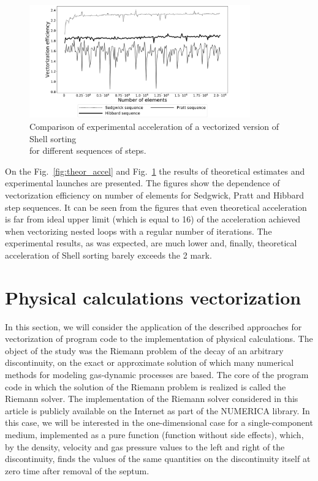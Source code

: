 \documentclass[
11pt,%
tightenlines,%
twoside,%
onecolumn,%
nofloats,%
nobibnotes,%
nofootinbib,%
superscriptaddress,%
noshowpacs,%
centertags]%
{revtex4}
\begin{document}
\begin{figure}[h]
\setcaptionmargin{5mm}
\onelinecaptionsfalse
\includegraphics[width=0.85\textwidth]{pics/theoretical_eff.pdf}
\caption{Comparison of experimental acceleration of a vectorized version of Shell sorting \\ for different sequences of steps.}\label{experim_accel}
\end{figure}

On the Fig.~\ref{fig:theor_accel} and Fig.~\ref{experim_accel} the results of theoretical estimates and experimental launches are presented. 
The figures show the dependence of vectorization efficiency on number of elements for Sedgwick, Pratt and Hibbard step sequences. 
It can be seen from the figures that even theoretical acceleration is far from ideal upper limit (which is equal to 16) of the acceleration achieved when vectorizing nested loops with a regular number of iterations.
The experimental results, as was expected, are much lower and, finally, theoretical acceleration of Shell sorting barely exceeds the  2 mark. 
        
\section{Physical calculations vectorization}

In this section, we will consider the application of the described approaches for vectorization of program code to the implementation of physical calculations.
The object of the study was the Riemann problem of the decay of an arbitrary discontinuity, on the exact or approximate solution of which many numerical methods for modeling gas-dynamic processes are based.
The core of the program code in which the solution of the Riemann problem is realized is called the Riemann solver.
The implementation of the Riemann solver considered in this article is publicly available on the Internet as part of the NUMERICA library.
In this case, we will be interested in the one-dimensional case for a single-component medium, implemented as a pure function (function without side effects), which, by the density, velocity and gas pressure values to the left and right of the discontinuity, finds the values of the same quantities on the discontinuity itself at zero time after removal of the septum.
\end{document}
